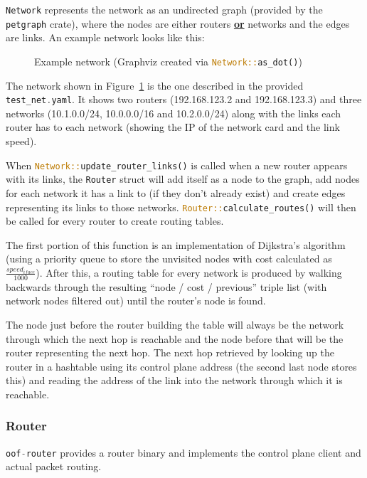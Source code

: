 \documentclass[a4paper]{article}
\numberwithin{figure}{section}
\numberwithin{table}{section}
\newcommand{\mi}{\mintinline}
\begin{document}
\medskip
\noindent \mi{rust}{Network} represents the network as an undirected graph (provided by the \mi{c}{petgraph} crate), where the nodes are either routers \textbf{\underline{or}} networks and the edges are links. An example network looks like this:

\begin{figure}[h!]
	\centering
	\resizebox{\columnwidth}{!}{
		
	}
	\caption{Example network (Graphviz created via \mi{rust}{Network::as_dot()})}
	\label{fig:test-net}
\end{figure}

The network shown in Figure~\ref{fig:test-net} is the one described in the provided \mi{c}{test_net.yaml}. It shows two routers (192.168.123.2 and 192.168.123.3) and three networks (10.1.0.0/24, 10.0.0.0/16 and 10.2.0.0/24) along with the links each router has to each network (showing the IP of the network card and the link speed).

When \mi{rust}{Network::update_router_links()} is called when a new router appears with its links, the \mi{rust}{Router} struct will add itself as a node to the graph, add nodes for each network it has a link to (if they don't already exist) and create edges representing its links to those networks. \mi{rust}{Router::calculate_routes()} will then be called for every router to create routing tables.

The first portion of this function is an implementation of Dijkstra's algorithm (using a priority queue to store the unvisited nodes with cost calculated as $\frac{speed_{iface}}{1000}$). After this, a routing table for every network is produced by walking backwards through the resulting ``node / cost / previous'' triple list (with network nodes filtered out) until the router's node is found.

The node just before the router building the table will always be the network through which the next hop is reachable and the node before that will be the router representing the next hop. The next hop retrieved by looking up the router in a hashtable using its control plane address (the second last node stores this) and reading the address of the link into the network through which it is reachable.

\subsubsection{Router}
\mi{c}{oof-router} provides a router binary and implements the control plane client and actual packet routing.
\end{document}
